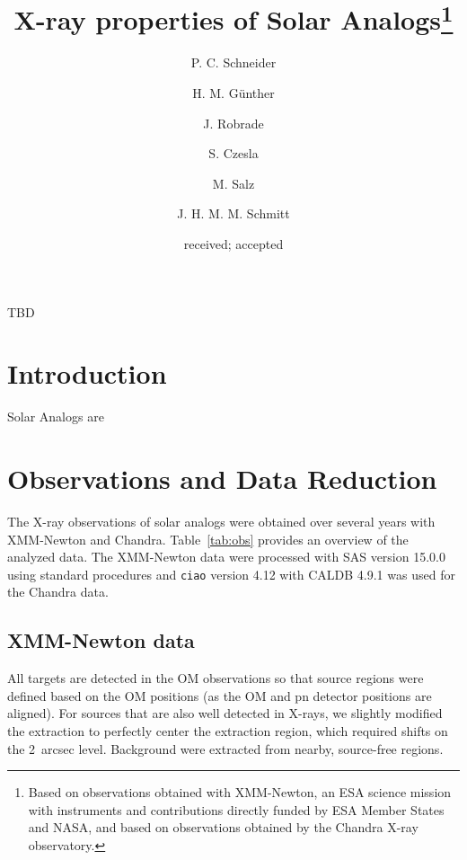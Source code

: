 \documentclass[oldversion]{aa}
\begin{document}
 

\title{X-ray properties of Solar Analogs\thanks{Based on observations obtained with XMM-Newton, an ESA science mission with instruments and contributions directly funded by ESA Member States and NASA, and based on observations obtained by the Chandra X-ray observatory.}}


   \author{P. C. Schneider
          \and
          H. M. G\"unther
          \and
          J. Robrade
          \and
          S. Czesla
          \and
          M. Salz
          \and
          J. H. M. M. Schmitt
          }

     
               
   \date{received; accepted}

 
  \abstract
   {
TBD
     }


   \maketitle
   
\section{Introduction}
Solar Analogs are



\section{Observations and Data Reduction}
The X-ray observations of solar analogs were obtained over several years with XMM-Newton and Chandra. Table~\ref{tab:obs} provides an overview of the analyzed data. The XMM-Newton data were processed with SAS version 15.0.0 using standard procedures
and \texttt{ciao} version 4.12 with CALDB 4.9.1 was used for the Chandra data.

\subsection{XMM-Newton data}
All targets are detected in the OM observations so that source regions were 
defined based on the OM positions (as the OM and pn detector positions are aligned). 
For sources that are also well detected in X-rays, we slightly modified the 
extraction to perfectly center the extraction region, which required shifts on 
the 2~arcsec level. Background were extracted from nearby, source-free regions.







 

\end{document}
